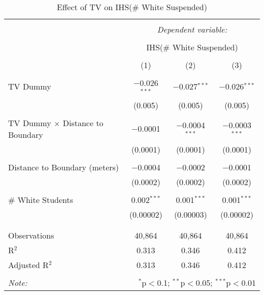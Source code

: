 
\begin{table}[!htbp] \centering 
  \caption{Effect of TV on IHS(\# White Suspended)} 
  \label{} 
\begin{tabular}{@{\extracolsep{-2pt}}lccc} 
\\[-1.8ex]\hline 
\hline \\[-1.8ex] 
 & \multicolumn{3}{c}{\textit{Dependent variable:}} \\ 
\cline{2-4} 
\\[-1.8ex] & \multicolumn{3}{c}{IHS(\# White Suspended)} \\ 
\\[-1.8ex] & (1) & (2) & (3)\\ 
\hline \\[-1.8ex] 
 TV Dummy & $-$0.026$^{***}$ & $-$0.027$^{***}$ & $-$0.026$^{***}$ \\ 
  & (0.005) & (0.005) & (0.005) \\ 
  & & & \\ 
 TV Dummy $\times$ Distance to Boundary & $-$0.0001 & $-$0.0004$^{***}$ & $-$0.0003$^{***}$ \\ 
  & (0.0001) & (0.0001) & (0.0001) \\ 
  & & & \\ 
 Distance to Boundary (meters) & $-$0.0004 & $-$0.0002 & $-$0.0001 \\ 
  & (0.0002) & (0.0002) & (0.0002) \\ 
  & & & \\ 
 \# White Students & 0.002$^{***}$ & 0.001$^{***}$ & 0.001$^{***}$ \\ 
  & (0.00002) & (0.00003) & (0.00002) \\ 
  & & & \\ 
\hline \\[-1.8ex] 
Observations & 40,864 & 40,864 & 40,864 \\ 
R$^{2}$ & 0.313 & 0.346 & 0.412 \\ 
Adjusted R$^{2}$ & 0.313 & 0.346 & 0.412 \\ 
\hline 
\hline \\[-1.8ex] 
\textit{Note:}  & \multicolumn{3}{r}{$^{*}$p$<$0.1; $^{**}$p$<$0.05; $^{***}$p$<$0.01} \\ 
\end{tabular} 
\end{table} 
